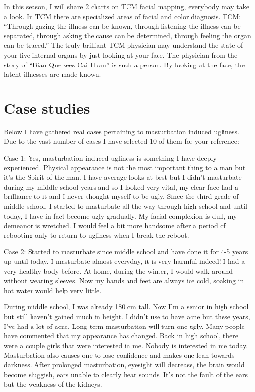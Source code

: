 \documentclass[
]{book}
\begin{document}
In this season, I will share 2 charts on TCM facial mapping, everybody may take a look. In TCM there are specialized areas of facial and color diagnosis. TCM: ``Through gazing the illness can be known, through listening the illness can be separated, through asking the cause can be determined, through feeling the organ can be traced.'' The truly brilliant TCM physician may understand the state of your five internal organs by just looking at your face. The physician from the story of ``Bian Que sees Cai Huan'' is such a person. By looking at the face, the latent illnesses are made known.

\hypertarget{case-studies}{%
\section{Case studies}\label{case-studies}}

Below I have gathered real cases pertaining to masturbation induced ugliness. Due to the vast number of cases I have selected 10 of them for your reference:

Case 1: Yes, masturbation induced ugliness is something I have deeply experienced. Physical appearance is not the most important thing to a man but it's the Spirit of the man. I have average looks at best but I didn't masturbate during my middle school years and so I looked very vital, my clear face had a brilliance to it and I never thought myself to be ugly. Since the third grade of middle school, I started to masturbate all the way through high school and until today, I have in fact become ugly gradually. My facial complexion is dull, my demeanor is wretched. I would feel a bit more handsome after a period of rebooting only to return to ugliness when I break the reboot.

Case 2: Started to masturbate since middle school and have done it for 4-5 years up until today. I masturbate almost everyday, it is very harmful indeed! I had a very healthy body before. At home, during the winter, I would walk around without wearing sleeves. Now my hands and feet are always ice cold, soaking in hot water would help very little.

During middle school, I was already 180 cm tall. Now I'm a senior in high school but still haven't gained much in height. I didn't use to have acne but these years, I've had a lot of acne. Long-term masturbation will turn one ugly. Many people have commented that my appearance has changed. Back in high school, there were a couple girls that were interested in me. Nobody is interested in me today. Masturbation also causes one to lose confidence and makes one lean towards darkness. After prolonged masturbation, eyesight will decrease, the brain would become sluggish, ears unable to clearly hear sounds. It's not the fault of the ears but the weakness of the kidneys.
\end{document}
